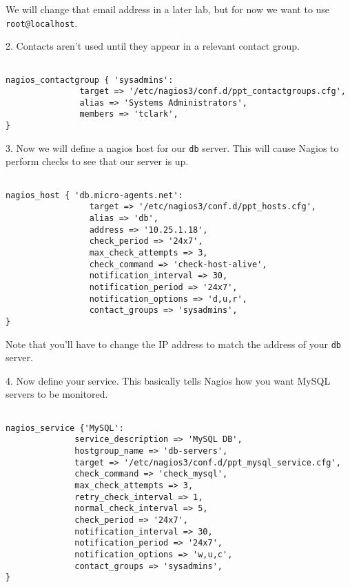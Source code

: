 \documentclass{article}         %
\begin{document}
We will change that email address in a later lab, but for now we want to use
\texttt{root@localhost}.

2. Contacts aren't used until they appear in a relevant contact group.

\begin{verbatim}

nagios_contactgroup { 'sysadmins':
               target => '/etc/nagios3/conf.d/ppt_contactgroups.cfg',
               alias => 'Systems Administrators',
               members => 'tclark', 
}

  \end{verbatim}



3. Now we will define a nagios host for our \texttt{db} server.
This will cause Nagios to perform checks to see that our server
is up.

\begin{verbatim}

nagios_host { 'db.micro-agents.net':
                 target => '/etc/nagios3/conf.d/ppt_hosts.cfg',
                 alias => 'db',
                 address => '10.25.1.18',
                 check_period => '24x7',
                 max_check_attempts => 3,
                 check_command => 'check-host-alive',
                 notification_interval => 30,
                 notification_period => '24x7',
                 notification_options => 'd,u,r',
                 contact_groups => 'sysadmins',
}
\end{verbatim}


Note that you'll have to change the IP address to match the address of
your \texttt{db} server.

4. Now define your service.  This basically tells Nagios
how you want MySQL servers to be monitored.

\begin{verbatim}

nagios_service {'MySQL':
              service_description => 'MySQL DB',
              hostgroup_name => 'db-servers',
              target => '/etc/nagios3/conf.d/ppt_mysql_service.cfg',
              check_command => 'check_mysql',
              max_check_attempts => 3,
              retry_check_interval => 1,
              normal_check_interval => 5,
              check_period => '24x7',
              notification_interval => 30,
              notification_period => '24x7',
              notification_options => 'w,u,c',
              contact_groups => 'sysadmins',
}
\end{verbatim}
\end{document}
